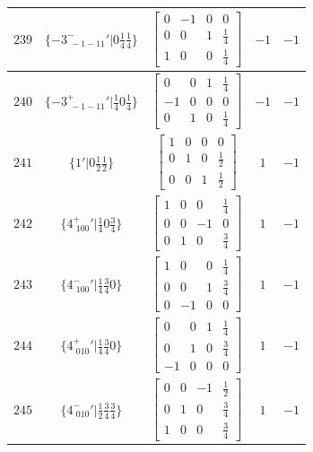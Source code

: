 \documentclass[fleqn,8pt]{jsarticle}
\begin{document}
\begin{longtable}{ccccc}
$ 239 $ & $ \{-3^{-}_{\,\,-1-11}{}'|0 \frac{1}{4} \frac{1}{4}\} $ & $ \begin{bmatrix} 0 & -1 & 0 & 0 \\ 0 & 0 & 1 & \frac{1}{4} \\ 1 & 0 & 0 & \frac{1}{4} \end{bmatrix} $ & $ -1 $ & $ -1 $ \\ \hline
$ 240 $ & $ \{-3^{+}_{\,\,-1-11}{}'|\frac{1}{4} 0 \frac{1}{4}\} $ & $ \begin{bmatrix} 0 & 0 & 1 & \frac{1}{4} \\ -1 & 0 & 0 & 0 \\ 0 & 1 & 0 & \frac{1}{4} \end{bmatrix} $ & $ -1 $ & $ -1 $ \\ \hline
$ 241 $ & $ \{1{}'|0 \frac{1}{2} \frac{1}{2}\} $ & $ \begin{bmatrix} 1 & 0 & 0 & 0 \\ 0 & 1 & 0 & \frac{1}{2} \\ 0 & 0 & 1 & \frac{1}{2} \end{bmatrix} $ & $ 1 $ & $ -1 $ \\ \hline
$ 242 $ & $ \{4^{+}_{\,\,100}{}'|\frac{1}{4} 0 \frac{3}{4}\} $ & $ \begin{bmatrix} 1 & 0 & 0 & \frac{1}{4} \\ 0 & 0 & -1 & 0 \\ 0 & 1 & 0 & \frac{3}{4} \end{bmatrix} $ & $ 1 $ & $ -1 $ \\ \hline
$ 243 $ & $ \{4^{-}_{\,\,100}{}'|\frac{1}{4} \frac{3}{4} 0\} $ & $ \begin{bmatrix} 1 & 0 & 0 & \frac{1}{4} \\ 0 & 0 & 1 & \frac{3}{4} \\ 0 & -1 & 0 & 0 \end{bmatrix} $ & $ 1 $ & $ -1 $ \\ \hline
$ 244 $ & $ \{4^{+}_{\,\,010}{}'|\frac{1}{4} \frac{3}{4} 0\} $ & $ \begin{bmatrix} 0 & 0 & 1 & \frac{1}{4} \\ 0 & 1 & 0 & \frac{3}{4} \\ -1 & 0 & 0 & 0 \end{bmatrix} $ & $ 1 $ & $ -1 $ \\ \hline
$ 245 $ & $ \{4^{-}_{\,\,010}{}'|\frac{1}{2} \frac{3}{4} \frac{3}{4}\} $ & $ \begin{bmatrix} 0 & 0 & -1 & \frac{1}{2} \\ 0 & 1 & 0 & \frac{3}{4} \\ 1 & 0 & 0 & \frac{3}{4} \end{bmatrix} $ & $ 1 $ & $ -1 $ \\ \hline

\end{longtable}
\end{document}
